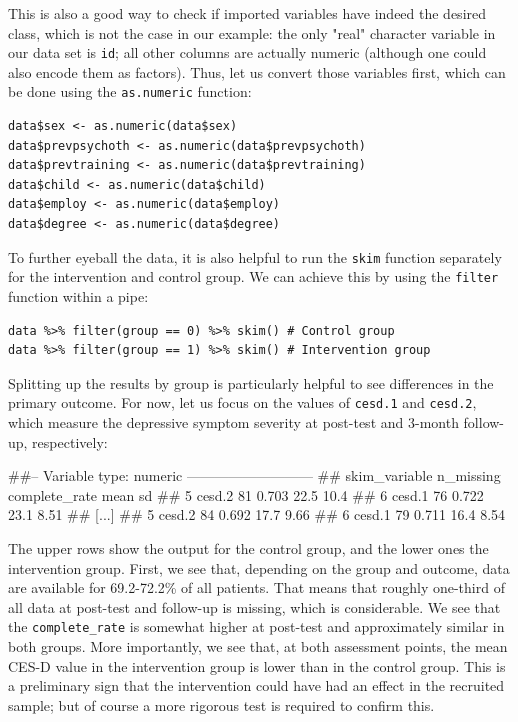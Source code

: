 This is also a good way to check if imported variables have indeed the desired class, which is not the case in our example: the only "real" character variable in our data set is \texttt{id}; all other columns are actually numeric (although one could also encode them as factors). Thus, let us convert those variables first, which can be done using the \texttt{as.numeric} function:

\begin{lstlisting}
data$sex <- as.numeric(data$sex)
data$prevpsychoth <- as.numeric(data$prevpsychoth)
data$prevtraining <- as.numeric(data$prevtraining)
data$child <- as.numeric(data$child)
data$employ <- as.numeric(data$employ)
data$degree <- as.numeric(data$degree)
\end{lstlisting}

To further eyeball the data, it is also helpful to run the \texttt{skim} function separately for the intervention and control group. We can achieve this by using the \texttt{filter} function within a pipe:

\begin{lstlisting}
data %>% filter(group == 0) %>% skim() # Control group
data %>% filter(group == 1) %>% skim() # Intervention group
\end{lstlisting}

Splitting up the results by group is particularly helpful to see differences in the primary outcome. For now, let us focus on the values of \texttt{cesd.1} and \texttt{cesd.2}, which measure the depressive symptom severity at post-test and 3-month follow-up, respectively:

\begin{example}
##-- Variable type: numeric ---------------------------
##   skim_variable n_missing complete_rate  mean    sd 
## 5 cesd.2               81         0.703 22.5  10.4  
## 6 cesd.1               76         0.722 23.1   8.51 
## [...]
## 5 cesd.2               84         0.692 17.7   9.66
## 6 cesd.1               79         0.711 16.4   8.54
\end{example}

The upper rows show the output for the control group, and the lower ones the intervention group. First, we see that, depending on the group and outcome, data are available for 69.2-72.2\% of all patients. That means that roughly one-third of all data at post-test and follow-up is missing, which is considerable. We see that the \texttt{complete\_rate} is somewhat higher at post-test and approximately similar in both groups. More importantly, we see that, at both assessment points, the mean CES-D value in the intervention group is lower than in the control group. This is a preliminary sign that the intervention could have had an effect in the recruited sample; but of course a more rigorous test is required to confirm this.

